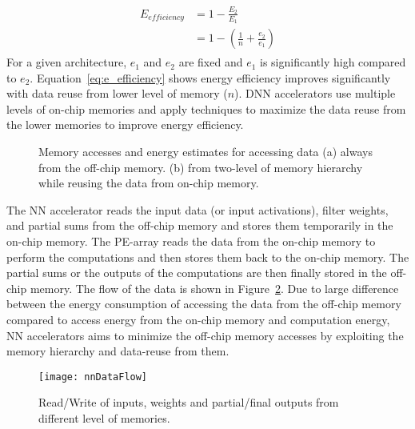 \begin{align}\label{eq:e_efficiency}
	\begin{split}
	E_{efficiency}&=1-\frac{E_2}{E_1}\\
	&=1-(\frac{1}{n}+\frac{e_{2}}{e_{1}})
	\end{split}
\end{align}
For a given architecture, $e_{1}$ and $e_{2}$ are fixed and $e_1$ is significantly high compared to $e_2$. Equation~\ref{eq:e_efficiency} shows energy efficiency improves significantly with data reuse from lower level of memory ($n$). DNN accelerators use multiple levels of on-chip memories and apply techniques to maximize the data reuse from the lower memories to improve energy efficiency. 
\begin{figure}[!htb]
	\centering
	\captionsetup{font=sf}
	\hfil	
	\hfil	
	\caption{Memory accesses and energy estimates for accessing data (a) always from the off-chip memory. (b) from two-level of memory hierarchy while reusing the data from on-chip memory.}
	\label{fig:memsAccess}
\end{figure}

The NN accelerator reads the input data (or input activations), filter weights, and partial sums from the off-chip memory and stores them temporarily in the on-chip memory. The PE-array reads the data from the on-chip memory to perform the computations and then stores them back to the on-chip memory. The partial sums or the outputs of the computations are then finally stored in the off-chip memory. The flow of the data is shown in Figure~\ref{fig:nnDataFlow}. Due to large difference between the energy consumption of accessing the data from the off-chip memory compared to access energy from the on-chip memory and computation energy, NN accelerators aims to minimize the off-chip memory accesses by exploiting the memory hierarchy and data-reuse from them.
\begin{figure}[!htb]
	\centering
	\captionsetup{font=sf}	
	\texttt{[image: nnDataFlow]}
	\caption{Read/Write of inputs, weights and partial/final outputs from different level of memories.}
	\label{fig:nnDataFlow}
\end{figure}

